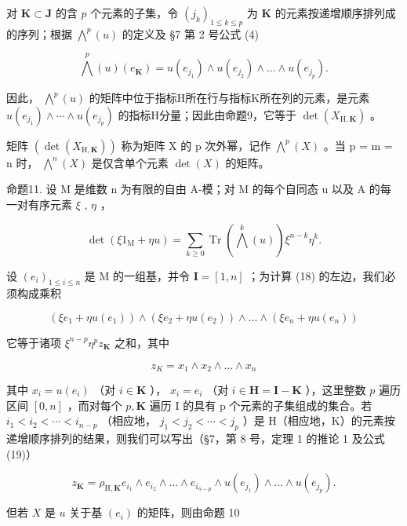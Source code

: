对 \(\mathbf{K} \subset \mathbf{J}\) 的含 \(p\) 个元素的子集，令 \((j_k)_{1 \leqslant k \leqslant p}\) 为 \(\mathbf{K}\) 的元素按递增顺序排列成的序列；根据 \(\bigwedge^p(u)\) 的定义及 §7 第 2 号公式 (4)

\[
\bigwedge^ {p} (u) \left(e _ {\mathbf {K}}\right) = u \left(e _ {j _ {1}}\right) \wedge u \left(e _ {j _ {2}}\right) \wedge \dots \wedge u \left(e _ {j _ {p}}\right).
\]

因此， \(\bigwedge^{p}(u)\) 的矩阵中位于指标H所在行与指标K所在列的元素，是元素 \(u(e_{j_1}) \wedge \cdots \wedge u(e_{j_p})\) 的指标H分量；因此由命题9，它等于 \(\det(X_{\mathrm{H},\mathbf{K}})\) 。

矩阵 \((\det(X_{\mathrm{H},\mathbf{K}}))\) 称为矩阵 X 的 p 次外幂，记作 \(\bigwedge^{p}(X)\) 。当 p = m = n 时， \(\bigwedge^{n}(X)\) 是仅含单个元素 \(\det(X)\) 的矩阵。

命题11. 设 M 是维数 n 为有限的自由 A-模；对 M 的每个自同态 u 以及 A 的每一对有序元素 \(\xi\) , \(\eta\) ，

\[
\det (\xi 1 _ {\mathrm{M}} + \eta u) = \sum_ {k \geqslant 0} \operatorname{Tr} \left(\bigwedge^ {k} (u)\right) \xi^ {n - k} \eta^ {k}.\tag{18}
\]

设 \((e_i)_{1\leqslant i\leqslant n}\) 是 M 的一组基，并令 \(\mathbf{I} = [1,n]\) ；为计算 (18) 的左边，我们必须构成乘积

\[
\left(\xi e _ {1} + \eta u (e _ {1})\right) \wedge \left(\xi e _ {2} + \eta u (e _ {2})\right) \wedge \dots \wedge \left(\xi e _ {n} + \eta u (e _ {n})\right)
\]

它等于诸项 \(\xi^{n - p}\eta^{p}z_{\mathbf{K}}\) 之和，其中

\[
z _ {K} = x _ {1} \wedge x _ {2} \wedge \dots \wedge x _ {n}
\]

其中 \(x_{i} = u(e_{i})\) （对 \(i \in \mathbf{K}\) ）， \(x_{i} = e_{i}\) （对 \(i \in \mathbf{H} = \mathbf{I} - \mathbf{K}\) ），这里整数 \(p\) 遍历区间 \([0, n]\) ，而对每个 \(p, \mathbf{K}\) 遍历 I 的具有 p 个元素的子集组成的集合。若 \(i_{1} < i_{2} < \cdots < i_{n-p}\) （相应地， \(j_{1} < j_{2} < \cdots < j_{p}\) ）是 H（相应地，K）的元素按递增顺序排列的结果，则我们可以写出（§7，第 8 号，定理 1 的推论 1 及公式 (19)）

\[
z _ {\mathbf {K}} = \rho_ {\mathrm{H}, \mathbf {K}} e _ {i _ {1}} \wedge e _ {i _ {2}} \wedge \dots \wedge e _ {i _ {n - p}} \wedge u (e _ {j _ {1}}) \wedge \dots \wedge u (e _ {j _ {p}}).
\]

但若 \(X\) 是 \(u\) 关于基 \((e_i)\) 的矩阵，则由命题 10

